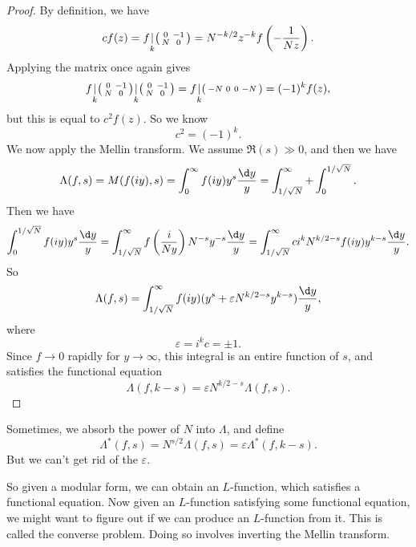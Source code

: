 \documentclass[a4paper]{article}
\begin{document}
\begin{proof}
  By definition, we have
  \[
    c f(z) =
    f\underset{k}{|}
    \begin{psmallmatrix}
      0 & -1\\
      N & 0
    \end{psmallmatrix} = N^{-k/2} z^{-k} f\left(-\frac{1}{Nz}\right).
  \]
  Applying the matrix once again gives
  \[
    f\underset{k}{|}
    \begin{psmallmatrix}
      0 & -1\\
      N & 0
    \end{psmallmatrix}\underset{k}{|}
    \begin{psmallmatrix}
      0 & -1\\
      N & 0
    \end{psmallmatrix}
    =
    f\underset{k}{|}
    \begin{psmallmatrix}
      -N & 0\
      0 & -N
    \end{psmallmatrix}
    = (-1)^k f(z),
  \]
  but this is equal to $c^2 f(z)$. So we know
  \[
    c^2 = (-1)^k.
  \]
  We now apply the Mellin transform. We assume $\Re(s) \gg 0$, and then we have
  \[
    \Lambda(f, s) = M(f(iy), s) = \int_0^\infty f(iy) y^s \frac{\d y}{y} = \int_{1/\sqrt{N}}^{\infty} + \int_0^{1/\sqrt{N}}.
  \]
  Then we have
  \[
    \int_0^{1/\sqrt{N}} f(iy) y^s \frac{\d y}{y} = \int_{1/\sqrt{N}}^\infty f\left(\frac{i}{Ny}\right) N^{-s}y^{-s} \frac{\d y}{y} = \int_{1/\sqrt{N}}^\infty c i^k N^{k/2 - s} f(iy) y^{k - s} \frac{\d y}{y}.
  \]
  So
  \[
    \Lambda(f, s) = \int_{1/\sqrt{N}}^\infty f(iy) (y^s + \varepsilon N^{k/2 - s} y^{k - s}) \frac{\d y}{y},
  \]
  where
  \[
    \varepsilon = i^k c = \pm 1.
  \]
  Since $f\to 0$ rapidly for $y \to \infty$, this integral is an entire function of $s$, and satisfies the functional equation
  \[
    \Lambda(f, k - s) = \varepsilon N^{k/2 - s} \Lambda (f, s).
  \]
\end{proof}
Sometimes, we absorb the power of $N$ into $\Lambda$, and define
\[
  \Lambda^*(f, s) = N^{s/2} \Lambda(f, s) = \varepsilon \Lambda^*(f, k - s).
\]
But we can't get rid of the $\varepsilon$.

So given a modular form, we can obtain an $L$-function, which satisfies a functional equation. Now given an $L$-function satisfying some functional equation, we might want to figure out if we can produce an $L$-function from it. This is called the converse problem. Doing so involves inverting the Mellin transform.
\end{document}
